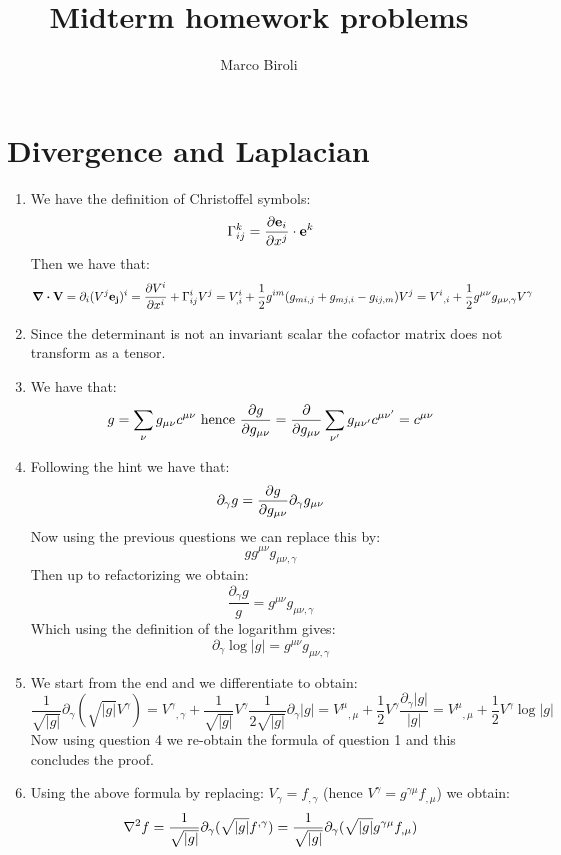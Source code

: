\documentclass[10pt,a4paper]{article}
\author{Marco Biroli}
\title{Midterm homework problems}
\begin{document}
\maketitle

\section{Divergence and Laplacian}

\begin{enumerate}

\item We have the definition of Christoffel symbols:
\[
\Gamma_{ij}^k = \pdv{\vb{e}_i}{x^j} \cdot \vb{e}^k
\]
Then we have that:
\[
\div \vb{V} = \partial_i ( V^j \vb{e_j})^i = \pdv{V^i}{x^i} + \Gamma^i_{i j} V^j = V^i_{, i} + \frac{1}{2} g^{im} ( g_{mi, j} + g_{mj, i} - g_{i j, m} ) V^j = {V^i}_{,i} + \frac{1}{2} g^{\mu \nu} g_{\mu \nu, \gamma} V^\gamma
\]

\item Since the determinant is not an invariant scalar the cofactor matrix does not transform as a tensor.

\item We have that:
\[
g = \sum_\nu g_{\mu \nu} c^{\mu \nu} \mbox{~hence~} \pdv{g}{g_{\mu \nu}} = \pdv{}{g_{\mu \nu}} \sum_{\nu'} g_{\mu \nu'} c^{\mu \nu'} = c^{\mu \nu}
\]

\item Following the hint we have that:
\[
\partial_\gamma g = \pdv{g}{g_{\mu \nu}} \partial_\gamma g_{\mu \nu}
\]
Now using the previous questions we can replace this by:
\[
g g^{\mu \nu} g_{\mu \nu, \gamma}
\]
Then up to refactorizing we obtain:
\[
\frac{\partial_\gamma g}{g} = g^{\mu \nu} g_{\mu \nu, \gamma}
\]
Which using the definition of the logarithm gives:
\[
\partial_\gamma \log |g| = g^{\mu \nu} g_{\mu \nu, \gamma}
\]

\item We start from the end and we differentiate to obtain:
\[
\frac{1}{\sqrt{|g|}} \partial_\gamma (\sqrt{|g|} V^\gamma) = {V^\gamma}_{, \gamma} + \frac{1}{\sqrt{|g|}} V^\gamma \frac{1}{2 \sqrt{|g|}} \partial_\gamma |g| = {V^\mu}_{, \mu} + \frac{1}{2} V^\gamma \frac{\partial_\gamma |g|}{|g|} = {V^\mu}_{, \mu} + \frac{1}{2} V^\gamma \log|g|
\]
Now using question 4 we re-obtain the formula of question 1 and this concludes the proof.

\item Using the above formula by replacing: $V_\gamma = f_{, \gamma}$ (hence $V^\gamma = g^{\gamma \mu} f_{,\mu}$) we obtain:
\[
\laplacian f = \frac{1}{\sqrt{|g|}} \partial_\gamma( \sqrt{|g|} f^{,\gamma} ) = \frac{1}{\sqrt{|g|}} \partial_\gamma( \sqrt{|g|} g^{\gamma \mu}f_{,\mu} )
\] 


\end{enumerate}
\end{document}
